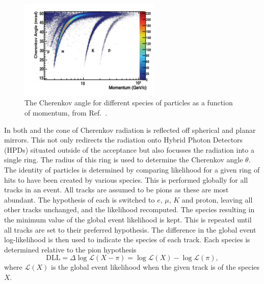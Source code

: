\begin{figure}[!h]
    \centering
    \includegraphics[width=0.6\textwidth]{figs/Detector/rich_speices.pdf}
    \caption{The Cherenkov angle for different species of particles as a function of momentum, from Ref.~\cite{LHCb-DP-2012-003}.}
    \label{fig:Dec_rich_species}   
\end{figure}


In both \richone and \richtwo the cone of Cherenkov radiation is reflected off spherical and planar mirrors. This not only redirects the radiation onto Hybrid Photon Detectors (HPDs) situated outside of the acceptance but also focusses the radiation into a single ring.    
The radius of this ring is used to determine the Cherenkov angle $\theta$. 
The identity of particles is determined by comparing likelihood for a given ring of hits to have been created by various species. 
This is performed globally for all tracks in an event. All tracks are assumed to be pions as these are most abundant. The hypothesis of each is switched to $e$, $\mu$, $K$ and proton, leaving all other tracks unchanged, and the likelihood recomputed. The species resulting in the minimum value of the global event likelihood is kept. This is repeated until all tracks are set to their preferred hypothesis. 
The difference in the global event log-likelihood is then used to indicate the species of each track. Each species is determined relative to the pion hypothesis 
\begin{equation}
\text{DLL} = \Delta \log{\mathcal{L}(X-\pi)} = \log{\mathcal{L}(X)} - \log{\mathcal{L}(\pi)},
\end{equation}
where $\mathcal{L}(X)$ is the global event likelihood when the given track is of the species $X$.




